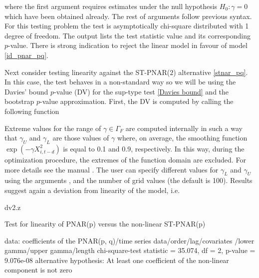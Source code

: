 \noindent
where the first argument requires  estimates  under the null hypothesis $H_0: \gamma = 0$ which have been obtained already. The rest of arguments follow previous syntax. For this testing problem   %
the test is asymptotically chi-square distributed with 1 degree of freedom. The output lists  the test statistic value and its corresponding  $p$-value. There is strong indication to  reject  the linear model in favour of  model \eqref{id_pnar_pq}.

Next consider  testing   linearity against the  ST-PNAR($2$) alternative \eqref{stnar_pq}. In this case, the test behaves in a non-standard way  %
 so we  will be using the Davies' bound $p$-value (DV) for the sup-type test \eqref{Davies bound} and  the bootstrap $p$-value approximation.  First, the DV  is computed   by calling the following function


\noindent
Extreme values  for the range of $\gamma \in \Gamma_F$ are computed internally in such a way that 
$\gamma_U$ and $\gamma_L$ are those  values of $\gamma$ where, on average,  the smoothing function $\exp(-\gamma X_{i,t-d}^2)$ is  equal to 0.1 and 0.9, respectively. In this way, during the optimization procedure, 
the extremes of the function domain are excluded. For more details see the  manual \citep{armillotta_et_al_rpackage_2022}. The user can specify different values for $\gamma_L$ and $\gamma_U$   using the arguments  ,   and the number of   grid  values  (the default is 100). Results  suggest  again a deviation from linearity of the model, i.e.

\begin{example}    
	dv2.z
	
	        Test for linearity of PNAR(p) versus the non-linear ST-PNAR(p)
	
	data:  coefficients of the PNAR(p, q)/time series data/order/lag/covariates
	/lower gamma/upper gamma/length
	chi-square-test statistic = 35.074, df = 2, p-value = 9.076e-08
	alternative hypothesis: At least one coefficient of the non-linear component 
	is not zero
\end{example}

